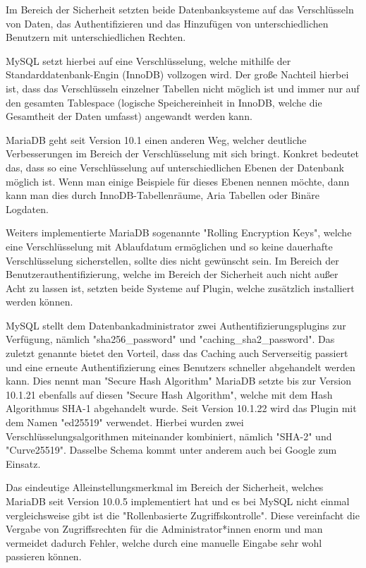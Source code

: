 
Im Bereich der Sicherheit setzten beide Datenbanksysteme auf das Verschlüsseln von Daten, das Authentifizieren und das Hinzufügen von unterschiedlichen Benutzern mit unterschiedlichen Rechten. \cite{MariaVsMy}

MySQL setzt hierbei auf eine Verschlüsselung, welche mithilfe der Standarddatenbank-Engin (InnoDB) vollzogen wird. Der große Nachteil hierbei ist, dass das Verschlüsseln einzelner Tabellen nicht möglich ist und immer nur auf den gesamten Tablespace (logische Speichereinheit in InnoDB, welche die Gesamtheit der Daten umfasst) angewandt werden kann. \cite{MariaVsMy}

MariaDB geht seit Version 10.1 einen anderen Weg, welcher deutliche Verbesserungen im Bereich der Verschlüsselung mit sich bringt. Konkret bedeutet das, dass so eine Verschlüsselung auf unterschiedlichen Ebenen der Datenbank möglich ist. Wenn man einige Beispiele für dieses Ebenen nennen möchte, dann kann man dies durch InnoDB-Tabellenräume, Aria Tabellen oder Binäre Logdaten. \cite{MariaVsMy}

Weiters implementierte MariaDB sogenannte "Rolling Encryption Keys", welche eine Verschlüsselung mit Ablaufdatum ermöglichen und so keine dauerhafte Verschlüsselung sicherstellen, sollte dies nicht gewünscht sein.
Im Bereich der Benutzerauthentifizierung, welche im Bereich der Sicherheit auch nicht außer Acht zu lassen ist, setzten beide Systeme auf Plugin, welche zusätzlich installiert werden können. \cite{MariaVsMy}

MySQL stellt dem Datenbankadministrator zwei Authentifizierungsplugins zur Verfügung, nämlich "sha256\_password" und "caching\_sha2\_password". Das zuletzt genannte bietet den Vorteil, dass das Caching auch Serverseitig passiert und eine erneute Authentifizierung eines Benutzers schneller abgehandelt werden kann. Dies nennt man "Secure Hash Algorithm"
MariaDB setzte bis zur Version 10.1.21 ebenfalls auf diesen "Secure Hash Algorithm", welche mit dem Hash Algorithmus SHA-1 abgehandelt wurde. Seit Version 10.1.22 wird das Plugin mit dem Namen "ed25519" verwendet. Hierbei wurden zwei Verschlüsselungsalgorithmen miteinander kombiniert, nämlich "SHA-2" und "Curve25519". Dasselbe Schema kommt unter anderem auch bei Google zum Einsatz. \cite{MariaVsMy}

Das eindeutige Alleinstellungsmerkmal im Bereich der Sicherheit, welches MariaDB seit Version 10.0.5 implementiert hat und es bei MySQL nicht einmal vergleichsweise gibt ist die "Rollenbasierte Zugriffskontrolle". Diese vereinfacht die Vergabe von Zugriffsrechten für die Administrator*innen enorm und man vermeidet dadurch Fehler, welche durch eine manuelle Eingabe sehr wohl passieren können. \cite{MariaVsMy}

